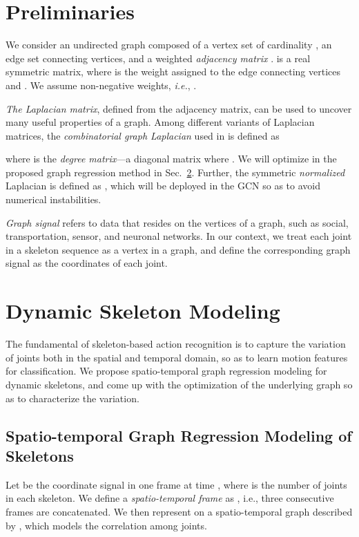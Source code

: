 \documentclass[conference]{IEEEtran}
\begin{document}
\section{Preliminaries}
\label{sec:Laplacian}
We consider an undirected graph  composed of a vertex set  of cardinality , an edge set  connecting vertices, and a weighted \textit{adjacency matrix} .  is a real symmetric  matrix, where  is the weight assigned to the edge  connecting vertices  and . We assume non-negative weights, \textit{i.e.}, .

\textit{The Laplacian matrix}, defined from the adjacency matrix, can be used to uncover many useful properties of a graph. Among different variants of Laplacian matrices, the \textit{combinatorial graph Laplacian} used in \cite{shen10pcs,hu14tip} is defined as 

where  is the \textit{degree matrix}---a diagonal matrix where . We will optimize  in the proposed graph regression method in Sec.~\ref{sec:modeling}. Further, the symmetric \textit{normalized} Laplacian is defined as , which will be deployed in the GCN so as to avoid numerical instabilities. 





\textit{Graph signal} refers to data that resides on the vertices of a graph, such as social, transportation, sensor, and neuronal networks. In our context, we treat each joint in a skeleton sequence as a vertex in a graph, and define the corresponding graph signal as the coordinates of each joint.



\section{Dynamic Skeleton Modeling}
\label{sec:modeling}

The fundamental of skeleton-based action recognition is to capture the variation of joints both in the spatial and temporal domain, so as to learn motion features for classification. We propose spatio-temporal graph regression modeling for dynamic skeletons, and come up with the optimization of the underlying graph so as to characterize the variation.  

\subsection{Spatio-temporal Graph Regression Modeling of Skeletons}

Let  be the coordinate signal in one frame at time , where  is the number of joints in each skeleton. We define a \textit{spatio-temporal frame} as , i.e., three consecutive frames are concatenated. We then represent  on a spatio-temporal graph described by , which models the correlation among joints. 
\end{document}
